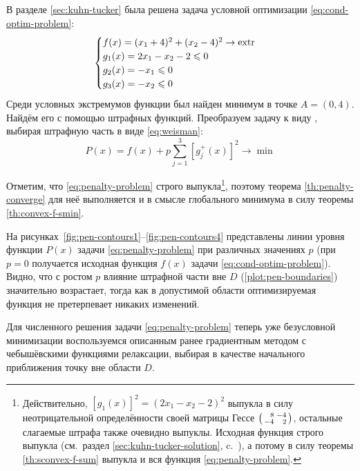 В разделе \ref{sec:kuhn-tucker} была решена задача условной
оптимизации \eqref{eq:cond-optim-problem}:
\begin{equation*}
  \begin{cases}
    f(x) = (x_1+4)^2 + (x_2-4)^2 \to \operatorname{extr} \\
    g_1(x) = 2x_1 - x_2 - 2 \leqslant 0 \\
    g_2(x) = -x_1 \leqslant 0 \\
    g_3(x) = -x_2 \leqslant 0
  \end{cases}
\end{equation*}
Среди условных экстремумов функции был найден минимум в точке $A = (0,
4)$. Найдём его с помощью штрафных функций. Преобразуем задачу к виду
\label{eq:penalty-iter}, выбирая штрафную часть в виде
\eqref{eq:weisman}:
\begin{equation}
  \label{eq:penalty-problem}
  P(x) = f(x) + p \sum_{j=1}^3{ \left [ g_j^+(x) \right ]^2} \to \min
\end{equation}

Отметим, что \eqref{eq:penalty-problem} строго
выпукла\footnote[1]{Действительно, $\left[g_1(x)\right]^2=(2x_1-x_2-2)^2$
  выпукла в силу неотрицательной определённости своей матрицы Гессе
  $\left(\begin{smallmatrix}\phm{}8&-4\\-4&\phm{}2 \end{smallmatrix}\right)$, остальные
  слагаемые штрафа также очевидно выпуклы. Исходная функция строго
  выпукла (см.~раздел \ref{sec:kuhn-tucker-solution},
  c.~\pageref{eq:cond-optim-hess}), а потому в силу теоремы
  \ref{th:sconvex-f-sum} выпукла и вся функция
  \eqref{eq:penalty-problem}.}, поэтому теорема
\ref{th:penalty-converge} для неё выполняется и в смысле глобального
минимума в силу теоремы \ref{th:convex-f-smin}.

На рисунках \ref{fig:pen-contours1}--\ref{fig:pen-contours4}
представлены линии уровня функции $P(x)$ задачи
\eqref{eq:penalty-problem} при различных значениях $p$ (при $p=0$
получается исходная функция $f(x)$ задачи
\eqref{eq:cond-optim-problem}). Видно, что с ростом $p$ влияние
штрафной части вне $D$ (\ref{plot:pen-boundaries}) значительно
возрастает, тогда как в допустимой области оптимизируемая функция не
претерпевает никаких изменений.



Для численного решения задачи \eqref{eq:penalty-problem} теперь уже
безусловной минимизации воспользуемся описанным ранее градиентным
методом с чебышёвскими функциями релаксации, выбирая в качестве
начального приближения точку вне области $D$.

